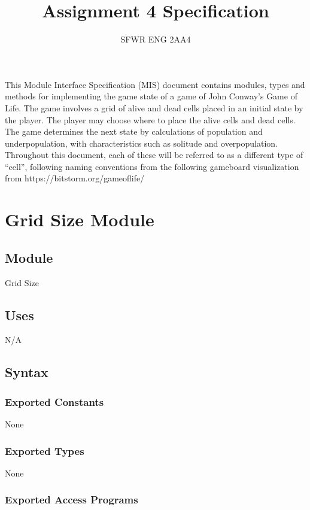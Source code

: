\documentclass[12pt]{article}
\title{Assignment 4 Specification}
\author{SFWR ENG 2AA4}
\begin{document}
\maketitle

\noindent This Module Interface Specification (MIS) document contains modules, types and methods for implementing the game state of 
a game of John Conway's Game of Life. The game involves a grid of alive and dead cells placed in an initial state by the player. The player
may choose where to place the alive cells and dead cells. The game determines the next state by calculations of population and
underpopulation, with characteristics such as solitude and overpopulation.
Throughout this document, each of these
will be referred to as a different type of ``cell'', following naming 
conventions from the following gameboard visualization from https://bitstorm.org/gameoflife/

\newpage

\section* {Grid Size Module}

\subsection*{Module}

Grid Size

\subsection* {Uses}

N/A

\subsection* {Syntax}

\subsubsection* {Exported Constants}

None

\subsubsection* {Exported Types}

None

\subsubsection* {Exported Access Programs}
\end{document}
